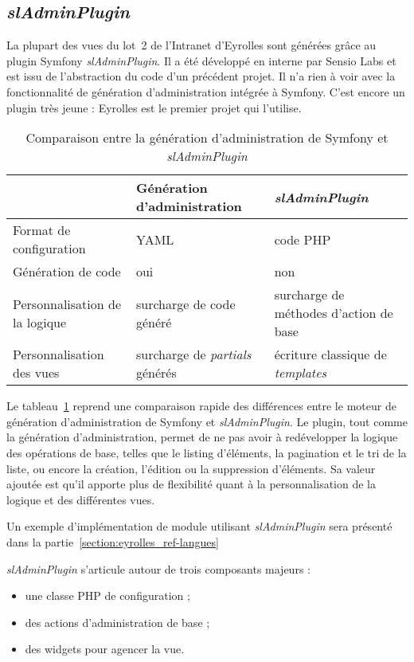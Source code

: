 \subsection{\textit{slAdminPlugin}}

La plupart des vues du lot~2 de l'Intranet d'Eyrolles sont générées grâce au plugin Symfony \textit{slAdminPlugin}. Il a été développé en interne par Sensio Labs et est issu de l'abstraction du code d'un précédent projet. Il n'a rien à voir avec la fonctionnalité de génération d'administration intégrée à Symfony. C'est encore un plugin très jeune : Eyrolles est le premier projet qui l'utilise.

\begin{table}
	\centering
	\begin{tabular}{|p{3cm}||p{4.5cm}|p{4.5cm}|}
		\hline
		& Génération d'administration & \textit{slAdminPlugin} \tabularnewline
		\hline
		\hline
		Format de configuration & YAML & code PHP \tabularnewline
		\hline
		Génération de code & oui & non \tabularnewline
		\hline
		Personnalisation de la logique & surcharge de code généré & surcharge de méthodes d'action de base \tabularnewline
		\hline
		Personnalisation des vues & surcharge de \textit{partials} générés & écriture classique de \textit{templates} \tabularnewline
		\hline
	\end{tabular}
	\caption{Comparaison entre la génération d'administration de Symfony et \textit{slAdminPlugin}}
	\label{table:eyrolles_sladmin-vs-admin-gen}
\end{table}

Le tableau~\ref{table:eyrolles_sladmin-vs-admin-gen} reprend une comparaison rapide des différences entre le moteur de génération d'administration de Symfony et \textit{slAdminPlugin}. Le plugin, tout comme la génération d'administration, permet de ne pas avoir à redévelopper la logique des opérations de base, telles que le listing d'éléments, la pagination et le tri de la liste, ou encore la création, l'édition ou la suppression d'éléments. Sa valeur ajoutée est qu'il apporte plus de flexibilité quant à la personnalisation de la logique et des différentes vues.

Un exemple d'implémentation de module utilisant \textit{slAdminPlugin} sera présenté dans la partie~\ref{section:eyrolles_ref-langues}

\textit{slAdminPlugin} s'articule autour de trois composants majeurs :
\begin{itemize}
	\item une classe PHP de configuration ;
	\item des actions d'administration de base ;
	\item des widgets pour agencer la vue.
\end{itemize}


